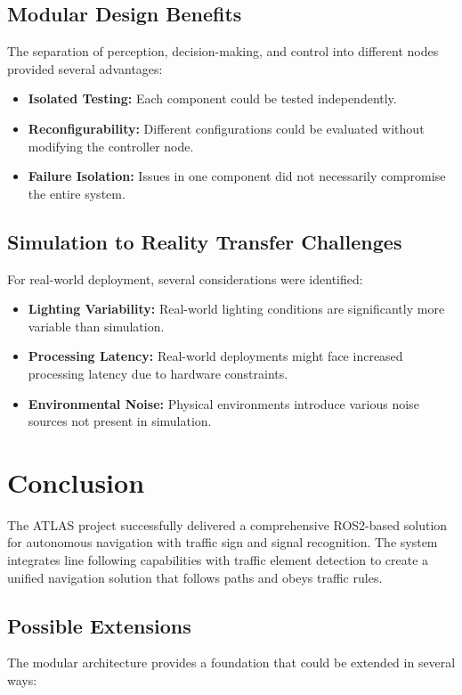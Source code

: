 \documentclass[9pt,technote]{IEEEtran}
\begin{document}
\subsection{Modular Design Benefits}
The separation of perception, decision-making, and control into different nodes provided several advantages:

\begin{itemize}
    \item \textbf{Isolated Testing:} Each component could be tested independently.
    \item \textbf{Reconfigurability:} Different configurations could be evaluated without modifying the controller node.
    \item \textbf{Failure Isolation:} Issues in one component did not necessarily compromise the entire system.
\end{itemize}

\subsection{Simulation to Reality Transfer Challenges}
For real-world deployment, several considerations were identified:

\begin{itemize}
    \item \textbf{Lighting Variability:} Real-world lighting conditions are significantly more variable than simulation.
    \item \textbf{Processing Latency:} Real-world deployments might face increased processing latency due to hardware constraints.
    \item \textbf{Environmental Noise:} Physical environments introduce various noise sources not present in simulation.
\end{itemize}

\section{Conclusion}
The ATLAS project successfully delivered a comprehensive ROS2-based solution for autonomous navigation with traffic sign and signal recognition. The system integrates line following capabilities with traffic element detection to create a unified navigation solution that follows paths and obeys traffic rules.

\subsection{Possible Extensions}
The modular architecture provides a foundation that could be extended in several ways:
\end{document}

